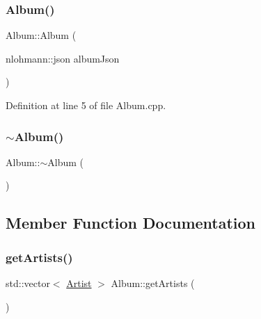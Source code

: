 \mbox{\label{class_album_a2288a063d899d20b1af2c10e04227f1e}} 
\subsubsection{\texorpdfstring{Album()}{Album()}\hspace{0.1cm}{\footnotesize\ttfamily [2/2]}}
{\footnotesize\ttfamily Album\+::\+Album (\begin{DoxyParamCaption}\item[{nlohmann\+::json}]{album\+Json }\end{DoxyParamCaption})}



Definition at line 5 of file Album.\+cpp.

\mbox{\label{class_album_a2c50054e79d185716987fe5edfcf62bf}} 
\subsubsection{\texorpdfstring{$\sim$\+Album()}{~Album()}}
{\footnotesize\ttfamily Album\+::$\sim$\+Album (\begin{DoxyParamCaption}{ }\end{DoxyParamCaption})\hspace{0.3cm}{\ttfamily [default]}}



\subsection{Member Function Documentation}
\mbox{\label{class_album_a764b966638dd47de75a5533472455120}} 
\subsubsection{\texorpdfstring{get\+Artists()}{getArtists()}}
{\footnotesize\ttfamily std\+::vector$<$ \mbox{\hyperlink{class_artist}{Artist}} $>$ Album\+::get\+Artists (\begin{DoxyParamCaption}{ }\end{DoxyParamCaption})}



